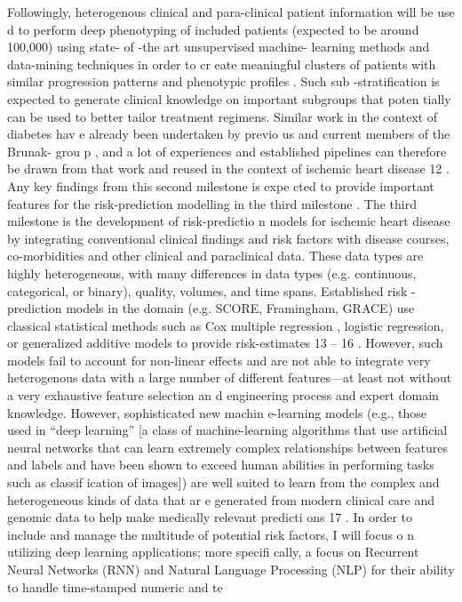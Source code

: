 Followingly,
heterogenous clinical and para-clinical patient information will be use
d to perform deep phenotyping of included patients 
(expected to be around 100,000) using state-
of
-the art unsupervised machine-
learning methods and data-mining techniques in order to cr
eate meaningful clusters of patients
with similar progression patterns and phenotypic profiles
.
Such sub
-stratification is expected to
generate clinical knowledge on important subgroups that poten
tially can be used to better tailor
treatment regimens. Similar work in the context of diabetes hav
e already been undertaken by
previo
us and current members of the Brunak-
grou
p
,
and a lot of experiences and established
pipelines can therefore be drawn from that work and reused
in the context of ischemic heart
disease
12
. Any key findings from this second milestone is expe
cted to provide important features
for the risk-prediction modelling in the third milestone
.
The third milestone is the development of risk-predictio
n models for ischemic heart disease by
integrating conventional clinical findings and risk factors
with disease courses, co-morbidities and
other clinical and paraclinical data. These data types are highly
heterogeneous, with many
differences in data types (e.g. continuous, categorical, or
binary), quality, volumes, and time
spans. Established
risk
-prediction models in the domain (e.g. SCORE, Framingham,
GRACE)
use
classical statistical methods such as Cox multiple regression
, logistic regression, or generalized
additive models to provide risk-estimates
13
–
16
.
However, such models fail to account for non-linear
effects and are not able to integrate very heterogenous data with
a large number of different
features—at least not without a very exhaustive feature selection an
d engineering process and
expert domain knowledge. However, sophisticated new machin
e-learning models (e.g., those used
in “deep learning” [a class of machine-learning algorithms
that use artificial neural networks that
can learn extremely complex relationships between features
and labels and have been shown to
exceed human abilities in performing tasks such as classif
ication of images]) are well suited to
learn from the complex and heterogeneous kinds of data that ar
e generated from modern clinical
care and genomic data to help make medically relevant predicti
ons
17
. In order to include and
manage the multitude of potential risk factors, I will focus o
n utilizing deep learning applications;
more specifi
cally, a focus on Recurrent Neural Networks (RNN) and Natural
Language Processing
(NLP) for their ability to handle time-stamped numeric and te
